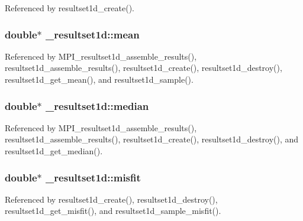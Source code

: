 Referenced by resultset1d\+\_\+create().

\subsubsection[{\texorpdfstring{mean}{mean}}]{\setlength{\rightskip}{0pt plus 5cm}double$\ast$ \+\_\+resultset1d\+::mean}\hypertarget{struct__resultset1d_a6d957028bdd700c111e33557c126b0bb}{}\label{struct__resultset1d_a6d957028bdd700c111e33557c126b0bb}


Referenced by M\+P\+I\+\_\+resultset1d\+\_\+assemble\+\_\+results(), resultset1d\+\_\+assemble\+\_\+results(), resultset1d\+\_\+create(), resultset1d\+\_\+destroy(), resultset1d\+\_\+get\+\_\+mean(), and resultset1d\+\_\+sample().

\subsubsection[{\texorpdfstring{median}{median}}]{\setlength{\rightskip}{0pt plus 5cm}double$\ast$ \+\_\+resultset1d\+::median}\hypertarget{struct__resultset1d_a70ff2fe553b904ec962d71a89faf7147}{}\label{struct__resultset1d_a70ff2fe553b904ec962d71a89faf7147}


Referenced by M\+P\+I\+\_\+resultset1d\+\_\+assemble\+\_\+results(), resultset1d\+\_\+assemble\+\_\+results(), resultset1d\+\_\+create(), resultset1d\+\_\+destroy(), and resultset1d\+\_\+get\+\_\+median().

\subsubsection[{\texorpdfstring{misfit}{misfit}}]{\setlength{\rightskip}{0pt plus 5cm}double$\ast$ \+\_\+resultset1d\+::misfit}\hypertarget{struct__resultset1d_a55913b86c00ac5f7447073e0909fd988}{}\label{struct__resultset1d_a55913b86c00ac5f7447073e0909fd988}


Referenced by resultset1d\+\_\+create(), resultset1d\+\_\+destroy(), resultset1d\+\_\+get\+\_\+misfit(), and resultset1d\+\_\+sample\+\_\+misfit().

